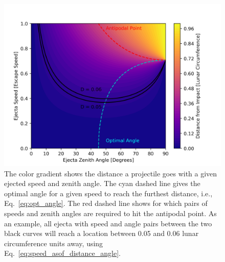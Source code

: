 \documentclass{hitec}
\begin{document}
\begin{figure}[h!]
	\centering
	\includegraphics[scale=0.85]{../Distance_vs_EjectaSpeed_and_ZenithAngle.png}
	\caption{The color gradient shows the distance a projectile goes with a given ejected speed and zenith angle. The cyan dashed line gives the optimal angle for a given speed to reach the furthest distance, i.e., Eq.\ \eqref{eq:opt_angle}. The red dashed line shows for which pairs of speeds and zenith angles are required to hit the antipodal point. As an example, all ejecta with speed and angle pairs between the two black curves will reach a location between 0.05 and 0.06 lunar circumference units away, using Eq.~\eqref{eq:speed_asof_distance_angle}.}\label{fig:Distance_vs_EjectaSpeed_and_ZenithAngle}
\end{figure}
\end{document}
